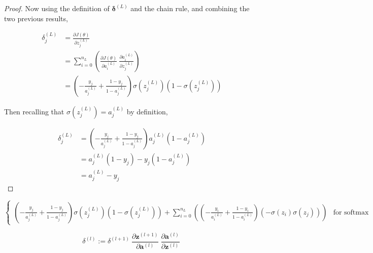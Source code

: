 \documentclass{article}
\begin{document}
\begin{proof}
            Now using the definition of $\mathbf{\delta}^{(L)}$ and the chain rule, and combining the two previous results,
            
            $$ \begin{aligned}
            \delta^{(L)}_j &= \frac{\partial J(\theta)}{\partial z^{(L)}_j} \\
            &= \sum_{i = 0}^{n_L} \left( \frac{\partial J(\theta)}{\partial a^{(L)}_i} \ \frac{\partial a^{(L)}_i}{\partial z^{(L)}_j} \right) \\
            &= \left( - \frac{y_j}{a^{(L)}_j} + \frac{1 - y_j}{1 - a^{(L)}_j} \right) \sigma(z^{(L)}_j) \left( 1 - \sigma(z^{(L)}_j) \right)
            \end{aligned} $$
            
            Then recalling that $\sigma(z^{(L)}_j) = a^{(L)}_j$ by definition,
            
            $$ \begin{aligned}
            \delta^{(L)}_j &= \left( - \frac{y_j}{a^{(L)}_j} + \frac{1 - y_j}{1 - a^{(L)}_j} \right) a^{(L)}_j \left( 1 - a^{(L)}_j \right) \\
            &= a^{(L)}_j (1 - y_j) - y_j (1 - a^{(L)}_j) \\
            &= a^{(L)}_j - y_j
            \end{aligned} $$
            
    
    
    
        \end{proof}




$$ \begin{cases}
\left( - \frac{y_j}{a^{(L)}_j} + \frac{1 - y_j}{1 - a^{(L)}_j} \right) \sigma(z^{(L)}_j) \left( 1 - \sigma(z^{(L)}_j) \right) + \sum_{i=0}^{n_L} \left( \left( - \frac{y_i}{a^{(L)}_i} + \frac{1 - y_i}{1 - a^{(L)}_i} \right) \left( - \sigma(z_i) \sigma(z_j) \right) \right) & \text{for softmax activation}
\end{cases}$$
        
        
        
        
        $$
        \delta^{(l)} :=
        \delta^{(l+1)} \
        \frac{\partial \mathbf{z}^{(l+1)}}{\partial \mathbf{a}^{(l)}} \
        \frac{\partial \mathbf{a}^{(l)}}{\partial \mathbf{z}^{(l)}} \
        $$
        
\end{document}
